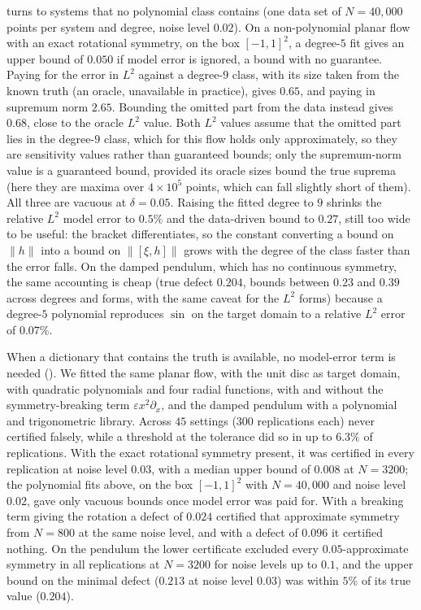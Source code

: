 \SFmodelerror{} turns to systems that no polynomial class contains (one data
set of $N = 40{,}000$ points per system and degree, noise level $0.02$). On a
non-polynomial planar flow with an exact rotational symmetry, on the box
$[-1,1]^2$, a degree-$5$ fit gives an upper bound of $0.050$ if model error is
ignored, a bound with no guarantee. Paying for the error in $L^2$ against a
degree-$9$ class, with its size taken from the known truth (an oracle,
unavailable in practice), gives $0.65$, and paying in supremum norm $2.65$.
Bounding the omitted part from the data instead gives $0.68$, close to the
oracle $L^2$ value. Both $L^2$ values assume that the omitted part lies in the
degree-$9$ class, which for this flow holds only approximately, so they are
sensitivity values rather than guaranteed bounds; only the supremum-norm
value is a guaranteed bound, provided its oracle sizes bound the true suprema
(here they are maxima over $4\times10^{5}$ points, which can fall slightly
short of them). All three are vacuous at
$\delta = 0.05$. Raising the fitted degree to $9$ shrinks the relative $L^2$
model error to $0.5\%$ and the data-driven bound to $0.27$, still too wide to
be useful: the bracket differentiates, so the constant converting a bound on
$\|h\|$ into a bound on $\|[\xi,h]\|$ grows with the degree of the class faster
than the error falls. On the damped pendulum, which has no continuous symmetry,
the same accounting is cheap (true defect $0.204$, bounds between $0.23$ and
$0.39$ across degrees and forms, with the same caveat for the $L^2$ forms)
because a degree-$5$ polynomial reproduces $\sin$ on the target domain to a
relative $L^2$ error of $0.07\%$.

When a dictionary that contains the truth is available, no model-error term is
needed (\STdictionary). We fitted the same planar flow, with the unit disc as
target domain, with quadratic polynomials and four radial functions, with
and without the symmetry-breaking term $\varepsilon x^2\partial_x$, and the
damped pendulum with a polynomial and trigonometric library. Across $45$
settings ($300$ replications each) \symcert{} never certified falsely, while a
threshold at the tolerance did so in up to $6.3\%$ of replications. With the
exact rotational symmetry present, it was certified in every replication at
noise level $0.03$, with a median upper bound of $0.008$ at $N = 3200$; the
polynomial fits above, on the box $[-1,1]^2$ with $N = 40{,}000$ and noise
level $0.02$, gave only vacuous bounds once model error was paid for. With a
breaking term giving the rotation a defect of $0.024$ \symcert{} certified
that approximate symmetry from $N = 800$ at the same noise level, and with a
defect of $0.096$ it certified nothing. On the pendulum the lower certificate
excluded every $0.05$-approximate symmetry in all replications at $N = 3200$
for noise levels up to $0.1$, and the upper bound on the minimal defect
($0.213$ at noise level $0.03$) was within $5\%$ of its true value ($0.204$).

